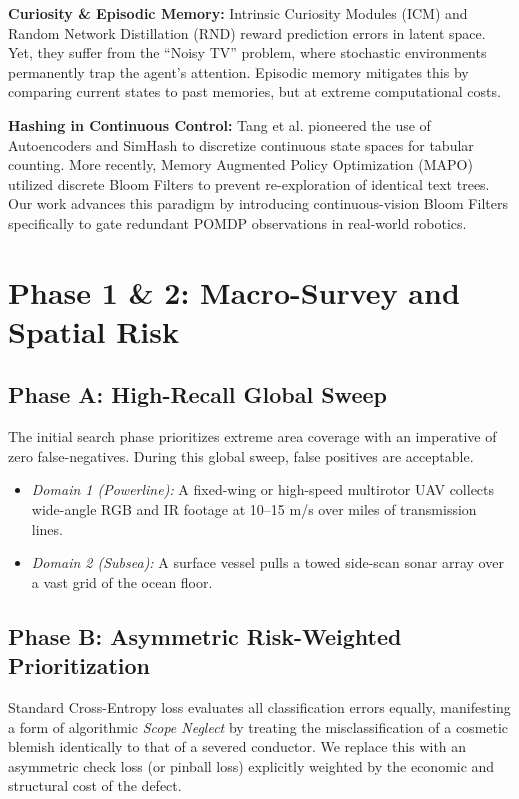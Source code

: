 \documentclass[conference]{IEEEtran}
\begin{document}
\textbf{Curiosity \& Episodic Memory:} Intrinsic Curiosity Modules (ICM) \cite{pathak2017curiosity} and Random Network Distillation (RND) \cite{burda2018exploration} reward prediction errors in latent space. Yet, they suffer from the ``Noisy TV'' problem, where stochastic environments permanently trap the agent's attention. Episodic memory \cite{badia2020agent57} mitigates this by comparing current states to past memories, but at extreme computational costs.

\textbf{Hashing in Continuous Control:} Tang et al. \cite{tang2017exploration} pioneered the use of Autoencoders and SimHash to discretize continuous state spaces for tabular counting. More recently, Memory Augmented Policy Optimization (MAPO) \cite{liang2018memory} utilized discrete Bloom Filters to prevent re-exploration of identical text trees. Our work advances this paradigm by introducing continuous-vision Bloom Filters specifically to gate redundant POMDP observations in real-world robotics.

\section{Phase 1 \& 2: Macro-Survey and Spatial Risk}

\subsection{Phase A: High-Recall Global Sweep}
The initial search phase prioritizes extreme area coverage with an imperative of zero false-negatives. During this global sweep, false positives are acceptable. 
\begin{itemize}
    \item \textit{Domain 1 (Powerline):} A fixed-wing or high-speed multirotor UAV collects wide-angle RGB and IR footage at 10--15 m/s over miles of transmission lines.
    \item \textit{Domain 2 (Subsea):} A surface vessel pulls a towed side-scan sonar array over a vast grid of the ocean floor.
\end{itemize}

\subsection{Phase B: Asymmetric Risk-Weighted Prioritization}
Standard Cross-Entropy loss evaluates all classification errors equally, manifesting a form of algorithmic \textit{Scope Neglect} by treating the misclassification of a cosmetic blemish identically to that of a severed conductor. We replace this with an asymmetric check loss (or pinball loss) explicitly weighted by the economic and structural cost of the defect. 
\end{document}
